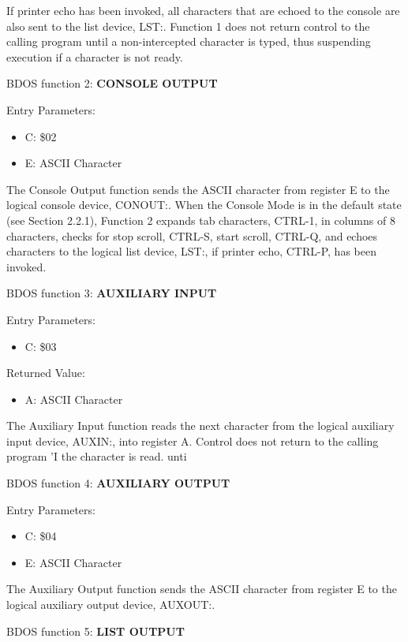 If printer echo has been invoked, all characters that are echoed to
the console are also sent to the list device, LST:.  Function 1 does
not return control to the calling program until a non-intercepted
character is typed, thus suspending execution if a character is not
ready.

BDOS function 2: \textbf{CONSOLE OUTPUT}

Entry Parameters:
\begin{itemize}
\item[] C: \$02
\item[] E: ASCII Character
\end{itemize}

The Console Output function sends the ASCII character from register E
to the logical console device, CONOUT:. When the Console Mode is in
the default state (see Section 2.2.1), Function 2 expands tab
characters, CTRL-1, in columns of 8 characters, checks for stop
scroll, CTRL-S, start scroll, CTRL-Q, and echoes characters to the
logical list device, LST:, if printer echo, CTRL-P, has been invoked.

BDOS function 3: \textbf{AUXILIARY INPUT}

Entry Parameters:
\begin{itemize}
\item[] C: \$03
\end{itemize}

Returned Value:
\begin{itemize}
\item[] A: ASCII Character
\end{itemize}

The Auxiliary Input function reads the next character from the logical
auxiliary input device, AUXIN:, into register A. Control does not
return to the calling program 'I the character is read.  unti

BDOS function 4: \textbf{AUXILIARY OUTPUT}

Entry Parameters:
\begin{itemize}
\item[] C: \$04
\item[] E: ASCII Character
\end{itemize}

The Auxiliary Output function sends the ASCII character from register
E to the logical auxiliary output device, AUXOUT:.

BDOS function 5: \textbf{LIST OUTPUT}

